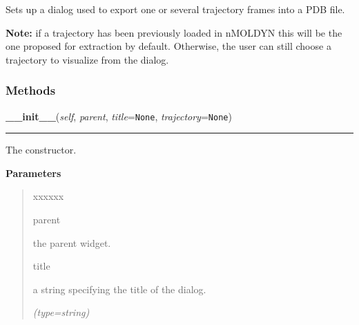 Sets up a dialog used to export one or several trajectory frames into a PDB
file.

\textbf{Note:} if a trajectory has been previously loaded in nMOLDYN this will be the one 
proposed for extraction by default. Otherwise, the user can still choose a 
trajectory to visualize from the dialog.





  \subsubsection{Methods}

    \label{nMOLDYN:GUI:PDBSnapshotGeneratorDialog:PDBSnapshotGeneratorDialog:__init__}

    \vspace{0.5ex}

\hspace{.8\funcindent}\begin{boxedminipage}{\funcwidth}

    \raggedright \textbf{\_\_init\_\_}(\textit{self}, \textit{parent}, \textit{title}={\tt None}, \textit{trajectory}={\tt None})

    \vspace{-1.5ex}

    \rule{\textwidth}{0.5\fboxrule}
\setlength{\parskip}{2ex}
    The constructor.

\setlength{\parskip}{1ex}
      \textbf{Parameters}
      \vspace{-1ex}

      \begin{quote}
        \begin{Ventry}{xxxxxx}

          \item[parent]

          the parent widget.

          \item[title]

          a string specifying the title of the dialog.

            {\it (type=string)}

        \end{Ventry}

      \end{quote}

    \end{boxedminipage}

